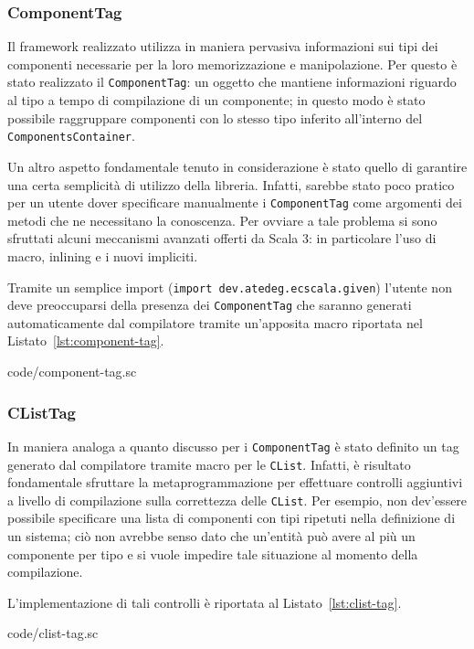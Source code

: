 \subsubsection{ComponentTag}
Il framework realizzato utilizza in maniera pervasiva informazioni sui tipi dei componenti necessarie
per la loro memorizzazione e manipolazione.
Per questo è stato realizzato il \texttt{ComponentTag}: un oggetto che mantiene informazioni riguardo
al tipo a tempo di compilazione di un componente;
in questo modo è stato possibile raggruppare componenti con lo stesso tipo inferito all'interno del
\texttt{ComponentsContainer}.

Un altro aspetto fondamentale tenuto in considerazione è stato quello di garantire una certa semplicità di
utilizzo della libreria.
Infatti, sarebbe stato poco pratico per un utente dover specificare manualmente i \texttt{ComponentTag}
come argomenti dei metodi che ne necessitano la conoscenza.
Per ovviare a tale problema si sono sfruttati alcuni meccanismi avanzati offerti da Scala 3:
in particolare l'uso di macro, inlining e i nuovi impliciti.

Tramite un semplice import (\texttt{import dev.atedeg.ecscala.given}) l'utente non deve preoccuparsi
della presenza dei \texttt{ComponentTag} che saranno generati automaticamente dal compilatore tramite
un'apposita macro riportata nel Listato~\ref{lst:component-tag}.


{code/component-tag.sc}

\subsubsection{CListTag}
In maniera analoga a quanto discusso per i \texttt{ComponentTag} è stato definito un tag generato dal
compilatore tramite macro per le \texttt{CList}.
Infatti, è risultato fondamentale sfruttare la metaprogrammazione per effettuare controlli aggiuntivi
a livello di compilazione sulla correttezza delle \texttt{CList}.
Per esempio, non dev'essere possibile specificare una lista di
componenti con tipi ripetuti nella definizione di un sistema; ciò non avrebbe
senso dato che un'entità può avere al più un componente per tipo e si vuole impedire tale situazione
al momento della compilazione.

L'implementazione di tali controlli è riportata al Listato~\ref{lst:clist-tag}.

{code/clist-tag.sc}

